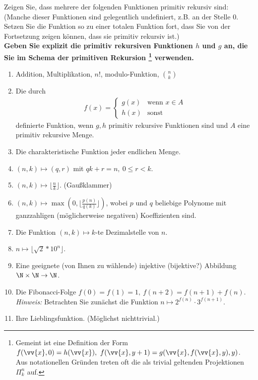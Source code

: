 
\begin{exercise}[194 + 195]

Zeigen Sie, dass mehrere der folgenden Funktionen primitiv rekursiv sind:
(Manche dieser Funktionen sind gelegentlich undefiniert, z.B. an der Stelle $0$.
Setzen Sie die Funktion so zu einer totalen Funktion fort, dass Sie von der
Fortsetzung zeigen können, dass sie primitiv rekursiv ist.) \\

\textbf{Geben Sie explizit die primitiv rekursiven Funktionen $h$ und $g$ an,
die Sie im Schema der primitiven Rekursion
\footnote{Gemeint ist eine Definition der Form $f(\vv{x},0) = h(\vv{x}),\
f(\vv{x}, y + 1) = g(\vv{x}, f(\vv{x},y), y)$. Aus notationellen Gründen
treten oft die als trivial geltenden Projektionen $\Pi_k^n$ auf.}
verwenden.}

\begin{enumerate}
	\item Addition, Multiplikation, $n!$, modulo-Funktion, $\binom{n}{k}$
	\item Die durch
	\begin{align*}
		f(x) = \begin{cases}
			g(x) & \text{wenn } x \in A \\
			h(x) & \text{sonst}
		\end{cases}
	\end{align*}
	definierte Funktion, wenn $g,h$ primitiv rekursive Funktionen sind und $A$
	eine primitiv rekursive Menge.
	\item Die charakteristische Funktion jeder endlichen Menge.
	\item $(n,k) \mapsto (q,r)$ mit $qk + r = n,\ 0 \leq r < k$.
	\item $(n,k) \mapsto \lfloor \frac{n}{k} \rfloor$. (Gaußklammer)
	\item $(n,k) \mapsto \max(0, \lfloor \frac{p(n)}{q(k)}\rfloor)$,
	wobei $p$ und $q$ beliebige Polynome mit ganzzahligen (möglicherweise
	negativen) Koeffizienten sind.
	\item Die Funktion $(n,k) \mapsto k$-te Dezimalstelle von $n$.
	\item $n \mapsto \lfloor \sqrt{2}*10^n\rfloor$.
	\item Eine geeignete (von Ihnen zu wählende) injektive (bijektive?) Abbildung
	$\N \times \N \to \N$.
	\item Die Fibonacci-Folge $f(0) = f(1) = 1,\ f(n+2) = f(n+1) + f(n)$.\\
	\textit{Hinweis:} Betrachten Sie zunächst die Funktion $n \mapsto 2^{f(n)}\cdot 3^{f(n+1)}$.
	\item Ihre Lieblingsfunktion. (Möglichst nichttrivial.)

\end{enumerate}

\end{exercise}


